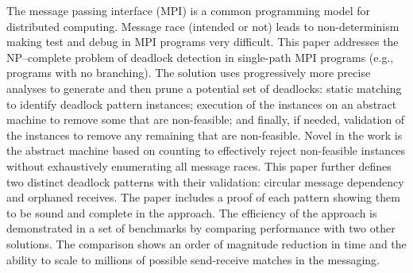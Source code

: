 The message passing interface (MPI) is a common programming model for distributed computing. Message race (intended or not) leads to non-determinism making test and debug in MPI programs very difficult. This paper addresses the NP--complete problem of deadlock detection in single-path MPI programs (e.g., programs with no branching). The solution uses progressively more precise analyses to generate and then prune a potential set of deadlocks: static matching to identify deadlock pattern instances; execution of the instances on an abstract machine to remove some that are non-feasible; and finally, if needed, validation of the instances to remove any remaining that are non-feasible. Novel in the work is the abstract machine based on counting to effectively reject non-feasible instances without exhaustively enumerating all message races. This paper further defines two distinct deadlock patterns with their validation: circular message dependency and orphaned receives. The paper includes a proof of each pattern showing them to be sound and complete in the approach. The efficiency of the approach is demonstrated in a set of benchmarks by comparing performance with two other solutions. The comparison shows an order of magnitude reduction in time and the ability to scale to millions of possible send-receive matches in the messaging.
